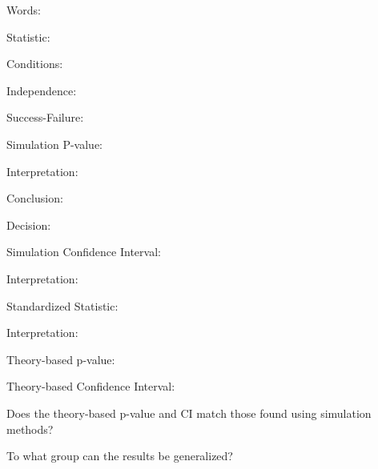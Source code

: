 \documentclass[
]{report}
\newcommand{\rgi}{\hspace{24pt}}  %
\begin{document}
\rgi \rgi Words:

\vspace{0.5in}

\rgi Statistic:

\vspace{0.3in}

\rgi Conditions:

\rgi \rgi Independence:

\vspace{0.8in}

\rgi \rgi Success-Failure:

\vspace{0.8in}

\rgi Simulation P-value:

\vspace{0.3in}

\rgi \rgi Interpretation:

\vspace{0.8in}

\rgi \rgi Conclusion:

\vspace{0.8in}

\rgi \rgi Decision:

\vspace{0.3in}

\rgi Simulation Confidence Interval:

\vspace{0.3in}

\rgi \rgi Interpretation:

\vspace{0.8in}

\rgi Standardized Statistic:

\vspace{0.3in}

\rgi \rgi Interpretation:

\vspace{0.8in}

\rgi Theory-based p-value:

\vspace{0.3in}

\rgi Theory-based Confidence Interval:

\vspace{0.5in}

\rgi Does the theory-based p-value and CI match those found using simulation methods?

\vspace{0.8in}

\rgi To what group can the results be generalized?
\end{document}
